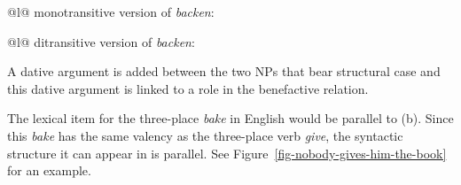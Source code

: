 \eal
\ex 
\begin{tabular}[t]{@{}l@{}}
monotransitive version of \emph{backen}:\\
\end{tabular}
\ex
\begin{tabular}[t]{@{}l@{}}
ditransitive version of \emph{backen}:\\
\end{tabular}
\zl
\largerpage[2]
A dative argument is added between the two NPs that bear structural case and this dative argument is
linked to a role in the benefactive relation.

The lexical item for the three-place \emph{bake} in English would be parallel to (b). Since
this \emph{bake} has the same valency as the three-place verb \emph{give}, the syntactic structure
it can appear in is parallel. See Figure~\ref{fig-nobody-gives-him-the-book} for an example.


